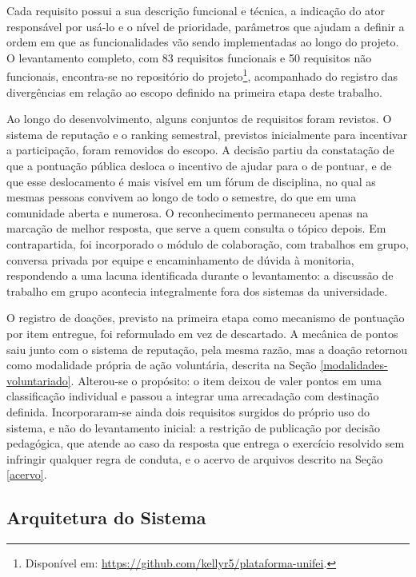 Cada requisito possui a sua descrição funcional e técnica, a indicação do ator
responsável por usá-lo e o nível de prioridade, parâmetros que ajudam a definir
a ordem em que as funcionalidades vão sendo implementadas ao longo do projeto.
O levantamento completo, com 83 requisitos funcionais e 50 requisitos não
funcionais, encontra-se no repositório do projeto\footnote{Disponível em:
\url{https://github.com/kellyr5/plataforma-unifei}.}, acompanhado do registro
das divergências em relação ao escopo definido na primeira etapa deste
trabalho.

Ao longo do desenvolvimento, alguns conjuntos de requisitos foram revistos. O
sistema de reputação e o ranking semestral, previstos inicialmente para
incentivar a participação, foram removidos do escopo. A decisão partiu da
constatação de que a pontuação pública desloca o incentivo de ajudar para o de
pontuar, e de que esse deslocamento é mais visível em um fórum de disciplina,
no qual as mesmas pessoas convivem ao longo de todo o semestre, do que em uma
comunidade aberta e numerosa. O reconhecimento permaneceu apenas na marcação de
melhor resposta, que serve a quem consulta o tópico depois. Em contrapartida,
foi incorporado o módulo de colaboração, com trabalhos em grupo, conversa
privada por equipe e encaminhamento de dúvida à monitoria, respondendo a uma
lacuna identificada durante o levantamento: a discussão de trabalho em grupo
acontecia integralmente fora dos sistemas da universidade.

O registro de doações, previsto na primeira etapa como mecanismo de pontuação
por item entregue, foi reformulado em vez de descartado. A mecânica de pontos
saiu junto com o sistema de reputação, pela mesma razão, mas a doação retornou
como modalidade própria de ação voluntária, descrita na Seção
\ref{modalidades-voluntariado}. Alterou-se o propósito: o item deixou de valer
pontos em uma classificação individual e passou a integrar uma arrecadação com
destinação definida. Incorporaram-se ainda dois requisitos surgidos do próprio
uso do sistema, e não do levantamento inicial: a restrição de publicação por
decisão pedagógica, que atende ao caso da resposta que entrega o exercício
resolvido sem infringir qualquer regra de conduta, e o acervo de arquivos
descrito na Seção \ref{acervo}.

\subsection{Arquitetura do Sistema}

